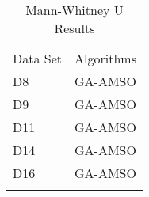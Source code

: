 \begin{table}
\caption{Mann-Whitney U Results}
\label{tbl:mann:whitney:u}
\begin{tabular}{ll}
\noalign{\smallskip}\hline\noalign{\smallskip}
Data Set & Algorithms \\
\noalign{\smallskip}\hline
D8&GA-AMSO\\
D9&GA-AMSO\\
D11&GA-AMSO\\
D14&GA-AMSO\\
D16&GA-AMSO\\
\noalign{\smallskip}\hline
\end{tabular}
\end{table}
